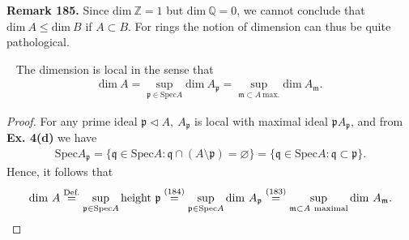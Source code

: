 \documentclass[12pt,a4paper,footinclude=true,headinclude=true]{scrbook} %
\newcommand\myeq[1]{\stackrel{\textnormal{#1}}{=}}
\newenvironment{proposition}[2][]
{\renewcommand\theinnercustomprop{#2}\innercustomprop[#1] 
\begin{mdframed}[backgroundcolor=gray!20]\ }
{\end{mdframed}\endinnercustomprop}
\newenvironment{remark}[2][Remark]
    { \begin{mdframed}[backgroundcolor=gray!20] \textbf{#1 #2.} }
    {  \end{mdframed}}
\begin{document}
\begin{remark}{185}
    Since $\mathrm{dim}\ \mathbb{Z}=1$ but $\mathrm{dim}\ \mathbb{Q}=0$, we cannot conclude that $\mathrm{dim}\ A\leq\mathrm{dim}\ B$ if $A\subset B$. For rings the notion of dimension can thus be quite pathological.
\end{remark}

\begin{proposition}{186}
    The dimension is local in the sense that 
    \begin{align*}
        \mathrm{dim}\ A=\sup\limits_{\mathfrak{p}\in\mathrm{Spec}A}\mathrm{dim}\ A_\mathfrak{p}=\sup\limits_{\mathfrak{m}\subset A\ \text{max.}}\mathrm{dim}\ A_\mathfrak{m}.
    \end{align*}
\end{proposition}
\begin{proof}
    For any prime ideal $\mathfrak{p}\triangleleft A,\ A_\mathfrak{p}$ is local with maximal ideal $\mathfrak{p}A_\mathfrak{p}$, and from \textbf{Ex. 4(d)} we have 
    \begin{align*}
        \mathrm{Spec}A_\mathfrak{p}=\{\mathfrak{q}\in\mathrm{Spec}A:\mathfrak{q}\cap(A\setminus\mathfrak{p})=\varnothing\}=\{\mathfrak{q}\in\mathrm{Spec}A:\mathfrak{q}\subset\mathfrak{p}\}.
    \end{align*}
    Hence, it follows that
    \begin{align*}
        \mathrm{dim}\ A \myeq{\text{Def.}} \sup\limits_{\mathfrak{p}\in\mathrm{Spec}A}\mathrm{height}\ \mathfrak{p}
        \myeq{\text{(184)}} \sup\limits_{\mathfrak{p}\in\mathrm{Spec}A}\mathrm{dim}\ A_\mathfrak{p}
        \myeq{\text{(183)}} \sup\limits_{\mathfrak{m}\subset A\ \text{maximal}}\mathrm{dim}\ A_\mathfrak{m}.
    \end{align*}
\end{proof}
\end{document}
